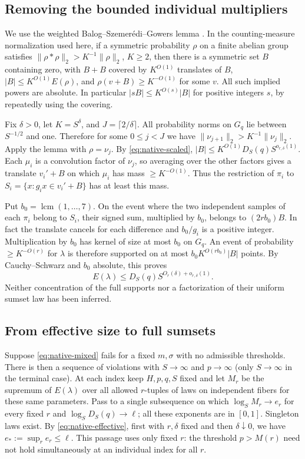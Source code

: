 \subsection*{Removing the bounded individual multipliers}
We use the weighted Balog--Szemer\'edi--Gowers lemma
\cite[Lemma~1]{TaoBSG}. In the counting-measure normalization used here,
if a symmetric probability $\rho$ on a finite abelian group satisfies
$\|\rho*\rho\|_2>K^{-1}\|\rho\|_2$, $K\ge2$, then there is a
symmetric set $B$ containing zero, with $B+B$ covered by $K^{O(1)}$
translates of $B$, $|B|\le K^{O(1)}E(\rho)$, and
$\rho(v+B)\ge K^{-O(1)}$ for some $v$. All such implied powers
are absolute. In particular $|s B|\le K^{O(s)}|B|$ for positive
integers $s$, by repeatedly using the covering.

Fix $\delta>0$, let $K=S^\delta$, and $J=\lceil2/\delta\rceil$.
All probability norms on $G_q$ lie between $S^{-1/2}$ and one.
Therefore for some $0\le j<J$ we have
$\|\nu_{j+1}\|_2>K^{-1}\|\nu_j\|_2$. Apply the lemma with
$\rho=\nu_j$. By \eqref{eq:native-scaled},
$|B|\le K^{O(1)}D_S(q)S^{o_{r,\delta}(1)}$. Each $\mu_i$ is
a convolution factor of $\nu_j$, so averaging over the other factors
gives a translate $v_i'+B$ on which $\mu_i$ has mass $\ge K^{-O(1)}$.
Thus the restriction of $\pi_i$ to
$S_i=\{x:g_i x\in v_i'+B\}$ has at least this mass.

Put $b_0=\operatorname{lcm}(1,\ldots,7)$. On the event where the
two independent samples of each $\pi_i$ belong to $S_i$, their signed
sum, multiplied by $b_0$, belongs to $(2r b_0)B$. In fact the
translate cancels for each difference and $b_0/g_i$ is a positive
integer. Multiplication by $b_0$ has kernel of size at most $b_0$ on
$G_q$. An event of probability $\ge K^{-O(r)}$ for $\lambda$ is
therefore supported on at most $b_0K^{O(r b_0)}|B|$ points. By
Cauchy--Schwarz and $b_0$ absolute, this proves
\begin{equation}\label{eq:native-effective}
 E(\lambda)\le D_S(q) S^{O_r(\delta)+o_{r,\delta}(1)}.
\end{equation}
Neither concentration of the full supports nor a factorization of their
uniform sumset law has been inferred.

\subsection*{From effective size to full sumsets}
Suppose \eqref{eq:native-mixed} fails for a fixed $m,\sigma$ with
no admissible thresholds. There is then a sequence of violations with
$S\to\infty$ and $p\to\infty$ (only $S\to\infty$ in the terminal
case). At each index keep $H,p,q,S$ fixed and let $M_r$ be the
supremum of $E(\lambda)$ over all allowed $r$-tuples of laws on
independent fibers for these same parameters. Pass to a single
subsequence on which $\log_S M_r\to e_r$ for every fixed $r$ and
$\log_S D_S(q)\to\ell$; all these exponents are in $[0,1]$.
Singleton laws exist. By \eqref{eq:native-effective}, first with
$r,\delta$ fixed and then $\delta\downarrow0$, we have
$e_*:=\sup_r e_r\le\ell$. This passage uses only fixed $r$: the
threshold $p>M(r)$ need not hold simultaneously at an individual
index for all $r$.

